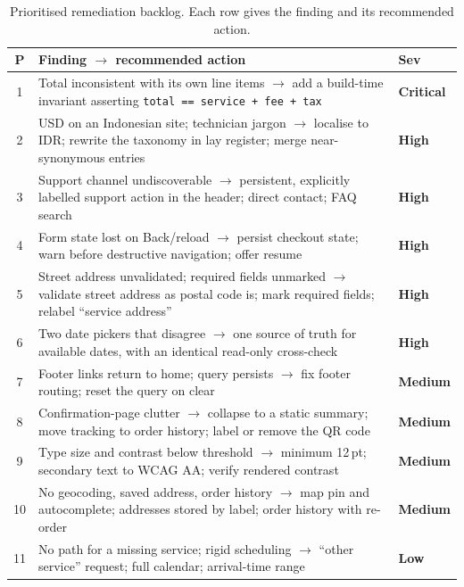 \documentclass[conference]{IEEEtran}
\begin{document}
\begin{table}[!t]
\caption{Prioritised remediation backlog. Each row gives the finding and
its recommended action.}
\label{tab:backlog}
\centering
\scriptsize
\setlength{\tabcolsep}{2.4pt}
\begin{tabular}{@{}c >{\raggedright\arraybackslash}p{5.9cm} >{\raggedright\arraybackslash}p{1.25cm}@{}}
\toprule
\textbf{P} & \textbf{Finding $\rightarrow$ recommended action} & \textbf{Sev} \\
\midrule
1 & Total inconsistent with its own line items $\rightarrow$ add a
  build-time invariant asserting \texttt{total == service + fee + tax}
  & \textbf{Critical} \\
2 & USD on an Indonesian site; technician jargon $\rightarrow$ localise to
  IDR; rewrite the taxonomy in lay register; merge near-synonymous
  entries & \textbf{High} \\
3 & Support channel undiscoverable $\rightarrow$ persistent, explicitly
  labelled support action in the header; direct contact; FAQ search
  & \textbf{High} \\
4 & Form state lost on Back/reload $\rightarrow$ persist checkout state;
  warn before destructive navigation; offer resume & \textbf{High} \\
5 & Street address unvalidated; required fields unmarked $\rightarrow$
  validate street address as postal code is; mark required fields; relabel
  ``service address'' & \textbf{High} \\
6 & Two date pickers that disagree $\rightarrow$ one source of truth for
  available dates, with an identical read-only cross-check
  & \textbf{High} \\
7 & Footer links return to home; query persists $\rightarrow$ fix footer
  routing; reset the query on clear & \textbf{Medium} \\
8 & Confirmation-page clutter $\rightarrow$ collapse to a static summary;
  move tracking to order history; label or remove the QR code
  & \textbf{Medium} \\
9 & Type size and contrast below threshold $\rightarrow$ minimum 12\,pt;
  secondary text to WCAG AA; verify rendered contrast & \textbf{Medium} \\
10 & No geocoding, saved address, order history $\rightarrow$ map pin and
  autocomplete; addresses stored by label; order history with re-order
  & \textbf{Medium} \\
11 & No path for a missing service; rigid scheduling $\rightarrow$ ``other
  service'' request; full calendar; arrival-time range & \textbf{Low} \\
\bottomrule
\end{tabular}
\end{table}
\end{document}
